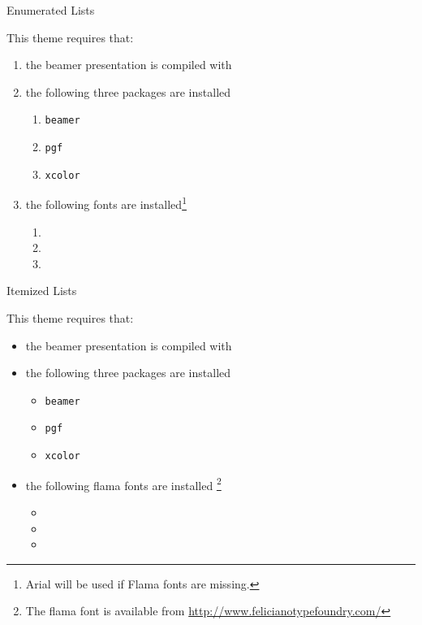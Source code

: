 \documentclass[compress]{beamer}
\begin{document}
\begin{frame}{Enumerated Lists}

This theme requires that:

\begin{enumerate}
	\item the beamer presentation is compiled with \XeTeX
	\item the following three packages are installed
	\begin{enumerate}
		\item \texttt{beamer}
		\item \texttt{pgf}
		\item \texttt{xcolor}
	\end{enumerate}
	\item the following fonts are installed\footnote{Arial will be used if Flama fonts are missing.}
	\begin{enumerate}
		\item {}
		\item {}
		\item {}
	\end{enumerate}
\end{enumerate}

\end{frame}


\begin{frame}{Itemized Lists}

This theme requires that:

\begin{itemize}
	\item the beamer presentation is compiled with \XeTeX
	\item the following three packages are installed
	\begin{itemize}
		\item \texttt{beamer}
		\item \texttt{pgf}
		\item \texttt{xcolor}
	\end{itemize}
	\item the following flama fonts are installed \footnote{The flama font is available from \href{http://www.felicianotypefoundry.com/cms/fonts/flama}{http://www.felicianotypefoundry.com/}}
	\begin{itemize}
		\item {}
		\item {}
		\item {}
	\end{itemize}
\end{itemize}

\end{frame}
\end{document}
